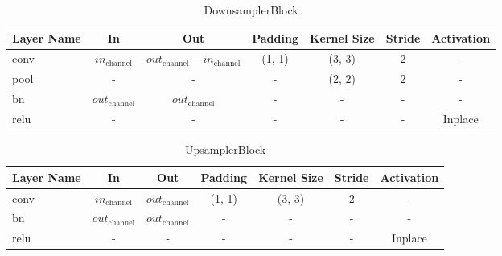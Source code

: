\begin{table}[htbp]
	\setlength{\abovecaptionskip}{10pt}
	\centering
	\begin{tabular}{|l|c|c|c|c|c|c|}
		\hline
		\textbf{Layer Name} & \textbf{In}            & \textbf{Out}                                 & \textbf{Padding} & \textbf{Kernel Size} & \textbf{Stride} & \textbf{Activation} \\
		\hline
		conv                & $in_{\text{channel}}$  & $out_{\text{channel}} - in_{\text{channel}}$ & (1, 1)           & (3, 3)               & 2               & -                   \\
		\hline
		pool                & -                      & -                                            & -                & (2, 2)               & 2               & -                   \\
		\hline
		bn                  & $out_{\text{channel}}$ & $out_{\text{channel}}$                       & -                & -                    & -               & -                   \\
		\hline
		relu                & -                      & -                                            & -                & -                    & -               & Inplace             \\
		\hline
	\end{tabular}
	\caption{DownsamplerBlock}
\end{table}

\begin{table}[htbp]
	\setlength{\abovecaptionskip}{10pt}
	\centering
	\begin{tabular}{|l|c|c|c|c|c|c|}
		\hline
		\textbf{Layer Name} & \textbf{In}            & \textbf{Out}           & \textbf{Padding} & \textbf{Kernel Size} & \textbf{Stride} & \textbf{Activation} \\
		\hline
		conv                & $in_{\text{channel}}$  & $out_{\text{channel}}$ & (1, 1)           & (3, 3)               & 2               & -                   \\
		\hline
		bn                  & $out_{\text{channel}}$ & $out_{\text{channel}}$ & -                & -                    & -               & -                   \\
		\hline
		relu                & -                      & -                      & -                & -                    & -               & Inplace             \\
		\hline
	\end{tabular}
	\caption{UpsamplerBlock}
\end{table}

